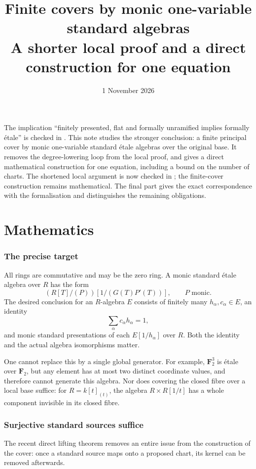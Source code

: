 \documentclass[11pt]{article}
\title{Finite covers by monic one-variable standard algebras\\
\large A shorter local proof and a direct construction for one equation}
\author{}
\date{1 November 2026}
\begin{document}
\maketitle

The implication ``finitely presented, flat and formally unramified
implies formally \'etale'' is checked in .
This note studies the stronger conclusion: a finite principal cover by
monic one-variable standard \'etale algebras over the original base.
It removes the degree-lowering loop from the local proof, and gives a
direct mathematical construction for one equation, including
a bound on the number of charts. The shortened local argument is now
checked in ; the finite-cover construction
remains mathematical. The final part gives the exact correspondence
with the formalisation and distinguishes the remaining obligations.

\part{Mathematics}

\section{The precise target}

All rings are commutative and may be the zero ring. A monic standard
\'etale algebra over $R$ has the form
\[
       (R[T]/(P))[1/(G(T)P'(T))],\qquad P\text{ monic}.
\]
The desired conclusion for an $R$-algebra $E$ consists of finitely many
$h_\alpha,c_\alpha\in E$, an identity
\[
                 \sum_\alpha c_\alpha h_\alpha=1,
\]
and monic standard presentations of each $E[1/h_\alpha]$ over $R$.
Both the identity and the actual algebra isomorphisms matter.

One cannot replace this by a single global generator. For example,
$\mathbf F_2^3$ is \'etale over $\mathbf F_2$, but any element has at
most two distinct coordinate values, and therefore cannot generate this
algebra. Nor does covering the closed fibre over a local base suffice:
for $R=k[t]_{(t)}$, the algebra $R\times R[1/t]$ has a whole component
invisible in its closed fibre.

\section{Surjective standard sources suffice}

The recent direct lifting theorem removes an entire issue from the
construction of the cover: once a standard source maps onto a proposed
chart, its kernel can be removed afterwards.
\end{document}
